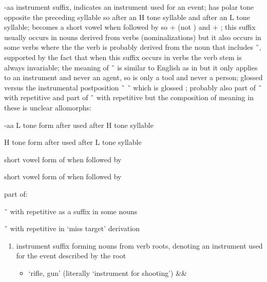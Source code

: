 \begin{morphdesc}[series=alphalist]
\item[-aa]\label{m:-aa}
	instrument suffix, indicates an instrument used for an event;
	has polar tone opposite the preceding syllable
		so  after an H tone syllable
		and  after an L tone syllable;
	becomes a short vowel when followed by 
		so  + 
			(not )
		and  + ;
	this suffix usually occurs in nouns derived from verbs (nominalizations)
		but it also occurs in some verbs where the the verb is probably
		derived from the noun that includes  \~\ ,
		supported by the fact that when this suffix occurs in verbs
		the verb stem is always invariable;
	the meaning of  \~\  is similar to English  as in 
		but it only applies to an instrument and never an agent,
		so  is only a tool and never a person;
	glossed  versus the instrumental postposition  \~\  \~\ 
		which is glossed ;
	probably also part of  \~\  with repetitive 
		and part of  \~\  with repetitive 
		but the composition of meaning in these is unclear
	\newline
	allomorphs:
	\begin{allolist}
	\item[-aa]	L tone form after used after H tone syllable
	\item[\X{-áa}]	H tone form after used after L tone syllable
	\item[\X{-a}]	short vowel form of  when followed by 
	\item[\X{-á}]	short vowel form of  when followed by 
	\end{allolist}
	part of:
	\begin{allolist}
	\item[\X{-jaa} \~\ \X{-jáa}]
			with repetitive  as a suffix in some nouns
	\item[\X{-x̱aa} \~\ \X{-x̱áa}]
			with repetitive  in ‘miss target’ derivation
	\end{allolist}
	\begin{enumerate}
	\item	instrument suffix forming nouns from verb roots,
		denoting an instrument used for the event described by the root
		\begin{itemize}
		\item	{} ‘rifle, gun’ (literally ‘instrument for shooting’)
					{&\·\xx{var}&\·}

\end{itemize}
\end{enumerate}
\end{morphdesc}
